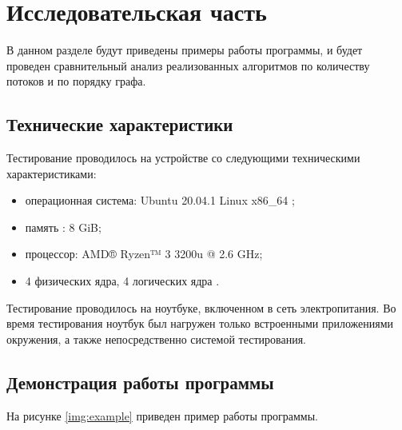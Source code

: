 \chapter{Исследовательская часть}

В данном разделе будут приведены примеры работы программы, и будет проведен сравнительный анализ реализованных алгоритмов по количеству потоков и по порядку графа.

\section{Технические характеристики}

Тестирование проводилось на устройстве со следующими техническими характеристиками:

\begin{itemize}
	\item операционная система: Ubuntu 20.04.1 Linux x86\_64 \cite{linux};
	\item память : 8 GiB;
	\item процессор: AMD® Ryzen™ 3 3200u @ 2.6 GHz;
	\item 4 физических ядра, 4 логических ядра \cite{amd}.
\end{itemize}

Тестирование проводилось на ноутбуке, включенном в сеть электропитания. Во время тестирования ноутбук был нагружен только встроенными приложениями окружения, а также непосредственно системой тестирования.

\clearpage

\section{Демонстрация работы программы}

На рисунке \ref{img:example} приведен пример работы программы.

